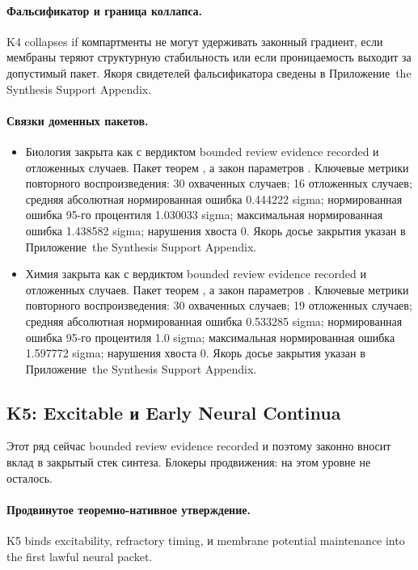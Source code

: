 \paragraph{Фальсификатор и граница коллапса.}
K4 collapses if компартменты не могут удерживать законный градиент, если мембраны теряют структурную стабильность или если проницаемость выходит за допустимый пакет.
Якоря свидетелей фальсификатора сведены в Приложение~the Synthesis Support Appendix.

\paragraph{Связки доменных пакетов.}
\begin{itemize}[leftmargin=1.6em,nosep]
\item Биология закрыта как  с вердиктом bounded review evidence recorded и  отложенных случаев. Пакет теорем , а закон параметров . Ключевые метрики повторного воспроизведения: 30 охваченных случаев; 16 отложенных случаев; средняя абсолютная нормированная ошибка 0.444222 sigma; нормированная ошибка 95-го процентиля 1.030033 sigma; максимальная нормированная ошибка 1.438582 sigma; нарушения хвоста 0. Якорь досье закрытия указан в Приложение~the Synthesis Support Appendix.
\item Химия закрыта как  с вердиктом bounded review evidence recorded и  отложенных случаев. Пакет теорем , а закон параметров . Ключевые метрики повторного воспроизведения: 30 охваченных случаев; 19 отложенных случаев; средняя абсолютная нормированная ошибка 0.533285 sigma; нормированная ошибка 95-го процентиля 1.0 sigma; максимальная нормированная ошибка 1.597772 sigma; нарушения хвоста 0. Якорь досье закрытия указан в Приложение~the Synthesis Support Appendix.
\end{itemize}

\subsection{K5: Excitable и Early Neural Continua}
\label{sec:oc-core-1-3-synthesis-k5}
Этот ряд сейчас bounded review evidence recorded и поэтому законно вносит вклад в закрытый стек синтеза.
Блокеры продвижения: на этом уровне не осталось.

\paragraph{Продвинутое теоремно-нативное утверждение.}
K5 binds excitability, refractory timing, и membrane potential maintenance into the first lawful neural packet.

